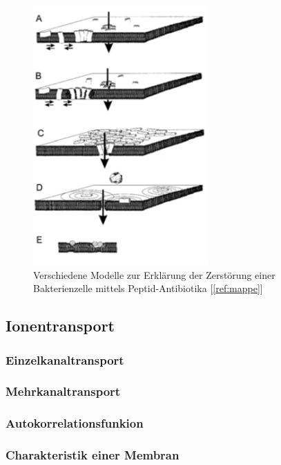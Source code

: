\documentclass[a4paper,ngerman]{scrartcl}
\begin{document}
\begin{figure}
\includegraphics[width=0.6\textwidth]{wirkmechanismus.png}
\caption{Verschiedene Modelle zur Erklärung der Zerstörung einer Bakterienzelle mittels Peptid-Antibiotika [\ref{ref:mappe}]}
\label{fig:wirkmechanismus}
\end{figure}




\subsection{Ionentransport}


\subsubsection{Einzelkanaltransport}



\subsubsection{Mehrkanaltransport}


\subsubsection{Autokorrelationsfunkion}


\subsubsection{Charakteristik einer Membran}
\end{document}
